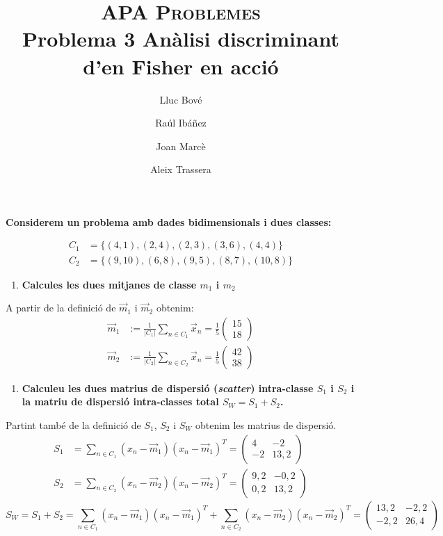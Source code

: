 \documentclass[a4paper]{article}
\title{\textsc{APA Problemes} \\ Problema 3 Anàlisi discriminant d'en Fisher en acció}
\author{Lluc Bové \and Raúl Ibáñez \and Joan Marcè \and Aleix Trassera}
\date{}
\begin{document}
\maketitle

\textbf{Considerem un problema amb dades bidimensionals i dues classes:}

\begin{align*}
	C_1 &= \{(4, 1), (2, 4), (2, 3), (3, 6), (4, 4)\} \\
	C_2 &= \{(9, 10), (6, 8), (9, 5), (8, 7), (10, 8)\}
\end{align*}

\begin{enumerate}[resume=main]
	\item \textbf{Calcules les dues mitjanes de classe $m_1$ i $m_2$}
\end{enumerate}
A partir de la definició de $\vec{m}_1$ i $\vec{m}_2$ obtenim:
\begin{align*}
\vec{m}_1 &:= \frac{1}{|C_1|} \sum_{n \in C_1} \vec{x}_n =
\frac{1}{5}
\begin{pmatrix}
15 \\
18
\end{pmatrix}
\\
\vec{m}_2 &:= \frac{1}{|C_2|} \sum_{n \in C_2} \vec{x}_n =
\frac{1}{5}
\begin{pmatrix}
42 \\
38
\end{pmatrix}
\end{align*}

\begin{enumerate}[resume=main]
	\item \textbf{Calculeu les dues matrius de dispersió (\emph{scatter}) intra-classe $S_1$ i $S_2$ i la matriu de dispersió intra-classes total $S_W = S_1 + S_2$.}
\end{enumerate}
Partint també de la definició de $S_1$, $S_2$ i $S_W$ obtenim les matrius de dispersió.
\begin{align*}
	S_1 &= \sum_{n \in C_1} (x_n - \vec{m}_1)(x_n - \vec{m}_1)^T = 
	\begin{pmatrix}
	4 & -2 \\
	-2 & 13,2
	\end{pmatrix} \\
	S_2 &= \sum_{n \in C_2} (x_n - \vec{m}_2)(x_n - \vec{m}_2)^T = 
	\begin{pmatrix}
	9,2 & -0,2 \\
	0,2 & 13,2
	\end{pmatrix}
\end{align*}
$$
S_W = S_1 + S_2 = 
\sum_{n \in C_1} (x_n - \vec{m}_1)(x_n - \vec{m}_1)^T + 
\sum_{n \in C_2} (x_n - \vec{m}_2)(x_n - \vec{m}_2)^T =
\begin{pmatrix}
13,2 & -2,2 \\
-2,2 & 26,4
\end{pmatrix}
$$
\end{document}
